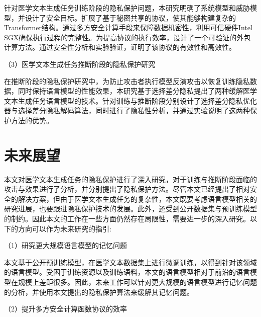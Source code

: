 针对医学文本生成任务训练阶段的隐私保护问题，本研究明确了系统模型和威胁模型，并设计了安全目标。扩展了基于秘密共享的协议，使其能够构建复杂的Transformer结构。通过多方安全计算手段来保障数据机密性，利用可信硬件Intel SGX确保执行过程的完整性。为提高协议的执行效率，设计了一个可验证的外包计算方法。通过安全性分析和实验验证，证明了该协议的有效性和高效性。

（3）医学文本生成任务推断阶段的隐私保护研究


在推断阶段的隐私保护研究中，为防止攻击者执行模型反演攻击以恢复训练隐私数据，同时保持语言模型的性能效果，本研究基于选择差分隐私提出了两种缓解医学文本生成任务语言模型的技术。针对训练与推断阶段分别设计了选择差分隐私优化器与选择差分隐私解码算法，同时进行了隐私性分析，并通过实验说明了这两种保护方法的优势。


\section{未来展望}

本文对医学文本生成任务的隐私保护进行了深入研究，对于训练与推断阶段面临的攻击与效果进行了分析，并分别提出了隐私保护方法。尽管本文已经提出了相对安全的解决方案，但由于医学文本生成任务的复杂性，本文既要考虑语言模型相关的研究进展，也要跟进隐私保护技术的发展。此外，还受到公开数据集与预训练模型的制约。因此本文的工作在一些方面仍然存在局限性，需要进一步的深入研究。以下的方向可以作为未来研究的指引:

（1）研究更大规模语言模型的记忆问题

本文基于公开预训练模型，在医学文本数据集上进行微调训练，以得到针对该领域的语言模型。受困于训练资源以及训练语料，本文的语言模型相对于前沿的语言模型在规模上差距很多。因此，未来工作可以针对更大规模的语言模型进行记忆问题的分析，并使用本文提出的隐私保护算法来缓解其记忆问题。

（2）提升多方安全计算函数协议的效率

